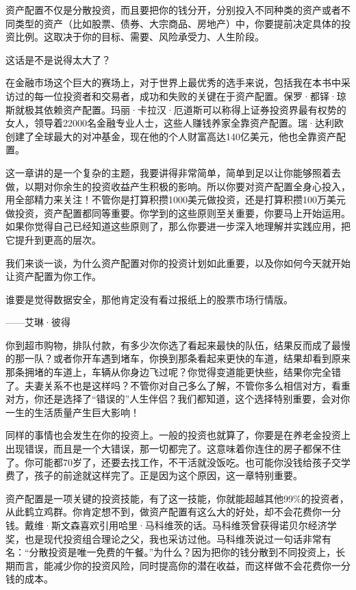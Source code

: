 资产配置不仅是分散投资，而且要把你的钱分开，分别投入不同种类的资产或者不同类型的资产（比如股票、债券、大宗商品、房地产）中，你要提前决定具体的投资比例。这取决于你的目标、需要、风险承受力、人生阶段。

这话是不是说得太大了？

在金融市场这个巨大的赛场上，对于世界上最优秀的选手来说，包括我在本书中采访过的每一位投资者和交易者，成功和失败的关键在于资产配置。保罗·都铎·琼斯就极其依赖资产配置。玛丽·卡拉汉·厄道斯可以称得上证券投资界最有权势的女人，领导着22000名金融专业人士，这些人赚钱养家全靠资产配置。瑞·达利欧创建了全球最大的对冲基金，现在他的个人财富高达140亿美元，他也全靠资产配置。

这一章讲的是一个复杂的主题，我要讲得非常简单，简单到足以让你能够照着去做，以期对你余生的投资收益产生积极的影响。所以你要对资产配置全身心投入，用全部精力来关注！不管你是打算积攒1000美元做投资，还是打算积攒100万美元做投资，资产配置都同等重要。你学到的这些原则至关重要，你要马上开始运用。如果你觉得自己已经知道这些原则了，那么你要进一步深入地理解并实践应用，把它提升到更高的层次。

我们来谈一谈，为什么资产配置对你的投资计划如此重要，以及你如何今天就开始让资产配置为你工作。

\begin{BookQuote}
谁要是觉得数据安全，那他肯定没有看过报纸上的股票市场行情版。

\hfill ——艾琳·彼得
\end{BookQuote}

你到超市购物，排队付款，有多少次你选了看起来最快的队伍，结果反而成了最慢的那一队？或者你开车遇到堵车，你换到那条看起来更快的车道，结果却看到原来那条拥堵的车道上，车辆从你身边飞过呢？你觉得变道能更快些，结果你完全错了。夫妻关系不也是这样吗？不管你对自己多么了解，不管你多么相信对方，看重对方，你还是选择了“错误的”人生伴侣？我们都知道，这个选择特别重要，会对你一生的生活质量产生巨大影响！

同样的事情也会发生在你的投资上。一般的投资也就算了，你要是在养老金投资上出现错误，而且是一个大错误，那一切都完了。这意味着你连住的房子都保不住了。你可能都70岁了，还要去找工作，不干活就没饭吃。也可能你没钱给孩子交学费了，孩子的前途就这样完了。正是因为这个原因，这一章特别重要。

资产配置是一项关键的投资技能，有了这一技能，你就能超越其他99\%的投资者，从此鹤立鸡群。你肯定想不到，做资产配置有这么大的好处，却不会花费你一分钱。戴维·斯文森喜欢引用哈里·马科维茨的话。马科维茨曾获得诺贝尔经济学奖，也是现代投资组合理论之父，我也采访过他。马科维茨说过一句话非常有名：“分散投资是唯一免费的午餐。”为什么？因为把你的钱分散到不同投资上，长期而言，能减少你的投资风险，同时提高你的潜在收益，而这样做不会花费你一分钱的成本。

